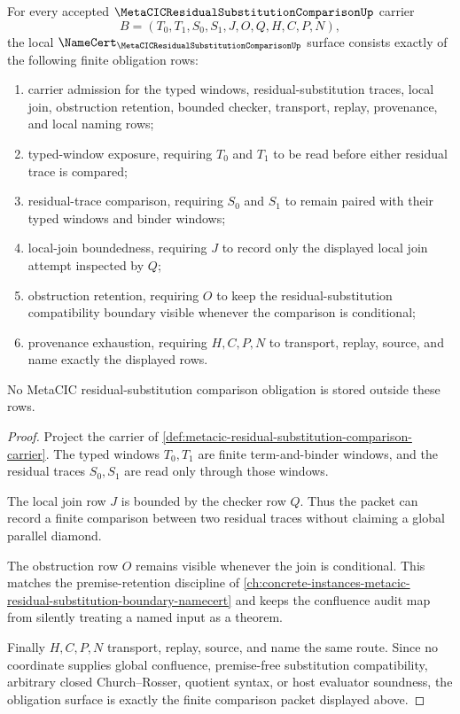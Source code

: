 \begin{theorem}
\label{thm:metacic-residual-substitution-comparison-namecert-obligations}
For every accepted $\MetaCICResidualSubstitutionComparisonUp$ carrier
$$
B=(T_0,T_1,S_0,S_1,J,O,Q,H,C,P,N),
$$
the local $\NameCert_{\MetaCICResidualSubstitutionComparisonUp}$ surface consists exactly of the following finite obligation rows:
\begin{enumerate}
\item carrier admission for the typed windows, residual-substitution traces, local join, obstruction retention, bounded checker, transport, replay, provenance, and local naming rows;
\item typed-window exposure, requiring $T_0$ and $T_1$ to be read before either residual trace is compared;
\item residual-trace comparison, requiring $S_0$ and $S_1$ to remain paired with their typed windows and binder windows;
\item local-join boundedness, requiring $J$ to record only the displayed local join attempt inspected by $Q$;
\item obstruction retention, requiring $O$ to keep the residual-substitution compatibility boundary visible whenever the comparison is conditional;
\item provenance exhaustion, requiring $H,C,P,N$ to transport, replay, source, and name exactly the displayed rows.
\end{enumerate}
No MetaCIC residual-substitution comparison obligation is stored outside these rows.
\end{theorem}
\begin{proof}
Project the carrier of \autoref{def:metacic-residual-substitution-comparison-carrier}. The typed windows $T_0,T_1$ are finite term-and-binder windows, and the residual traces $S_0,S_1$ are read only through those windows.

The local join row $J$ is bounded by the checker row $Q$. Thus the packet can record a finite comparison between two residual traces without claiming a global parallel diamond.

The obstruction row $O$ remains visible whenever the join is conditional. This matches the premise-retention discipline of \autoref{ch:concrete-instances-metacic-residual-substitution-boundary-namecert} and keeps the confluence audit map from silently treating a named input as a theorem.

Finally $H,C,P,N$ transport, replay, source, and name the same route. Since no coordinate supplies global confluence, premise-free substitution compatibility, arbitrary closed Church--Rosser, quotient syntax, or host evaluator soundness, the obligation surface is exactly the finite comparison packet displayed above.
\end{proof}

